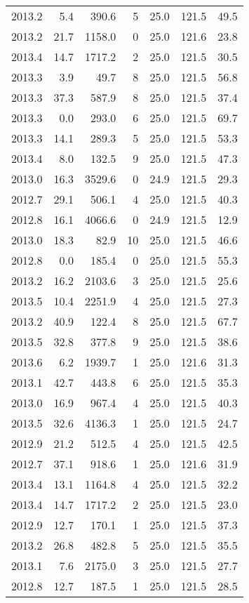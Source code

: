 \begin{tabular}{rrrrrrr}
2013.2 & 5.4 & 390.6 & 5 & 25.0 & 121.5 & 49.5 \\
2013.2 & 21.7 & 1158.0 & 0 & 25.0 & 121.6 & 23.8 \\
2013.4 & 14.7 & 1717.2 & 2 & 25.0 & 121.5 & 30.5 \\
2013.3 & 3.9 & 49.7 & 8 & 25.0 & 121.5 & 56.8 \\
2013.3 & 37.3 & 587.9 & 8 & 25.0 & 121.5 & 37.4 \\
2013.3 & 0.0 & 293.0 & 6 & 25.0 & 121.5 & 69.7 \\
2013.3 & 14.1 & 289.3 & 5 & 25.0 & 121.5 & 53.3 \\
2013.4 & 8.0 & 132.5 & 9 & 25.0 & 121.5 & 47.3 \\
2013.0 & 16.3 & 3529.6 & 0 & 24.9 & 121.5 & 29.3 \\
2012.7 & 29.1 & 506.1 & 4 & 25.0 & 121.5 & 40.3 \\
2012.8 & 16.1 & 4066.6 & 0 & 24.9 & 121.5 & 12.9 \\
2013.0 & 18.3 & 82.9 & 10 & 25.0 & 121.5 & 46.6 \\
2012.8 & 0.0 & 185.4 & 0 & 25.0 & 121.5 & 55.3 \\
2013.2 & 16.2 & 2103.6 & 3 & 25.0 & 121.5 & 25.6 \\
2013.5 & 10.4 & 2251.9 & 4 & 25.0 & 121.5 & 27.3 \\
2013.2 & 40.9 & 122.4 & 8 & 25.0 & 121.5 & 67.7 \\
2013.5 & 32.8 & 377.8 & 9 & 25.0 & 121.5 & 38.6 \\
2013.6 & 6.2 & 1939.7 & 1 & 25.0 & 121.6 & 31.3 \\
2013.1 & 42.7 & 443.8 & 6 & 25.0 & 121.5 & 35.3 \\
2013.0 & 16.9 & 967.4 & 4 & 25.0 & 121.5 & 40.3 \\
2013.5 & 32.6 & 4136.3 & 1 & 25.0 & 121.5 & 24.7 \\
2012.9 & 21.2 & 512.5 & 4 & 25.0 & 121.5 & 42.5 \\
2012.7 & 37.1 & 918.6 & 1 & 25.0 & 121.6 & 31.9 \\
2013.4 & 13.1 & 1164.8 & 4 & 25.0 & 121.5 & 32.2 \\
2013.4 & 14.7 & 1717.2 & 2 & 25.0 & 121.5 & 23.0 \\
2012.9 & 12.7 & 170.1 & 1 & 25.0 & 121.5 & 37.3 \\
2013.2 & 26.8 & 482.8 & 5 & 25.0 & 121.5 & 35.5 \\
2013.1 & 7.6 & 2175.0 & 3 & 25.0 & 121.5 & 27.7 \\
2012.8 & 12.7 & 187.5 & 1 & 25.0 & 121.5 & 28.5 \\

\end{tabular}
